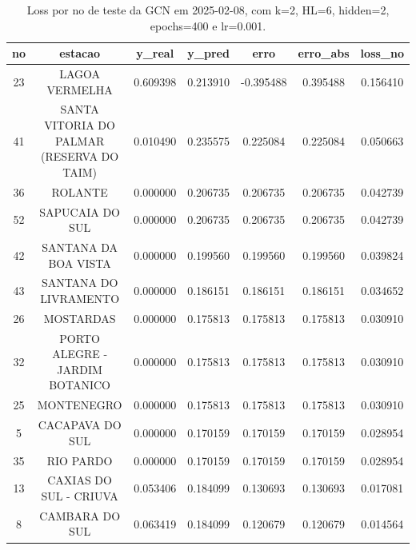 \begin{table}[h]
\centering
\caption{Loss por no de teste da GCN em 2025-02-08, com k=2, HL=6, hidden=2, epochs=400 e lr=0.001.}
\label{tab:gcn_loss_k2_hl6_h2_e400_d20250208}
\begin{tabular}{ccccccc}
\toprule
no & estacao & y\_real & y\_pred & erro & erro\_abs & loss\_no \\
\midrule
23 & LAGOA VERMELHA & 0.609398 & 0.213910 & -0.395488 & 0.395488 & 0.156410 \\
41 & SANTA VITORIA DO PALMAR (RESERVA DO TAIM) & 0.010490 & 0.235575 & 0.225084 & 0.225084 & 0.050663 \\
36 & ROLANTE & 0.000000 & 0.206735 & 0.206735 & 0.206735 & 0.042739 \\
52 & SAPUCAIA DO SUL & 0.000000 & 0.206735 & 0.206735 & 0.206735 & 0.042739 \\
42 & SANTANA DA BOA VISTA & 0.000000 & 0.199560 & 0.199560 & 0.199560 & 0.039824 \\
43 & SANTANA DO LIVRAMENTO & 0.000000 & 0.186151 & 0.186151 & 0.186151 & 0.034652 \\
26 & MOSTARDAS & 0.000000 & 0.175813 & 0.175813 & 0.175813 & 0.030910 \\
32 & PORTO ALEGRE - JARDIM BOTANICO & 0.000000 & 0.175813 & 0.175813 & 0.175813 & 0.030910 \\
25 & MONTENEGRO & 0.000000 & 0.175813 & 0.175813 & 0.175813 & 0.030910 \\
5 & CACAPAVA DO SUL & 0.000000 & 0.170159 & 0.170159 & 0.170159 & 0.028954 \\
35 & RIO PARDO & 0.000000 & 0.170159 & 0.170159 & 0.170159 & 0.028954 \\
13 & CAXIAS DO SUL - CRIUVA & 0.053406 & 0.184099 & 0.130693 & 0.130693 & 0.017081 \\
8 & CAMBARA DO SUL & 0.063419 & 0.184099 & 0.120679 & 0.120679 & 0.014564 \\
\bottomrule
\end{tabular}
\end{table}
